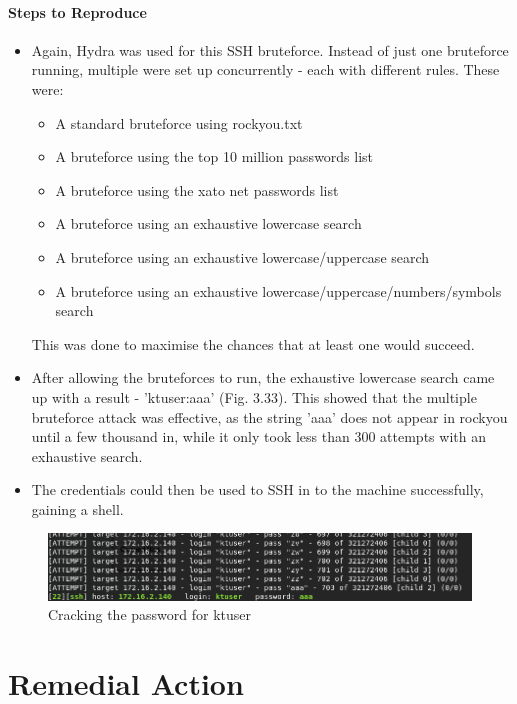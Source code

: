 \documentclass{report}
\begin{document}
\subsubsection{Steps to Reproduce}
\begin{itemize}
	\item Again, Hydra was used for this SSH bruteforce. Instead of just one bruteforce running, multiple were set up concurrently - each with different rules. These were:
	\begin{itemize}
		\item A standard bruteforce using rockyou.txt
		\item A bruteforce using the top 10 million passwords list
		\item A bruteforce using the xato net passwords list
		\item A bruteforce using an exhaustive lowercase search
		\item A bruteforce using an exhaustive lowercase/uppercase search
		\item A bruteforce using an exhaustive lowercase/uppercase/numbers/symbols search
	\end{itemize}
	This was done to maximise the chances that at least one would succeed.
	\item After allowing the bruteforces to run, the exhaustive lowercase search came up with a result - 'ktuser:aaa' (Fig. 3.33). This showed that the multiple bruteforce attack was effective, as the string 'aaa' does not appear in rockyou until a few thousand in, while it only took less than 300 attempts with an exhaustive search.
	\item The credentials could then be used to SSH in to the machine successfully, gaining a shell.
\end{itemize}
\begin{figure}[!htb]
	\centering
	\includegraphics[scale=0.6]{img/140ssh1.png}
	\caption{Cracking the password for ktuser}
\end{figure}





\chapter{Remedial Action}
\end{document}

